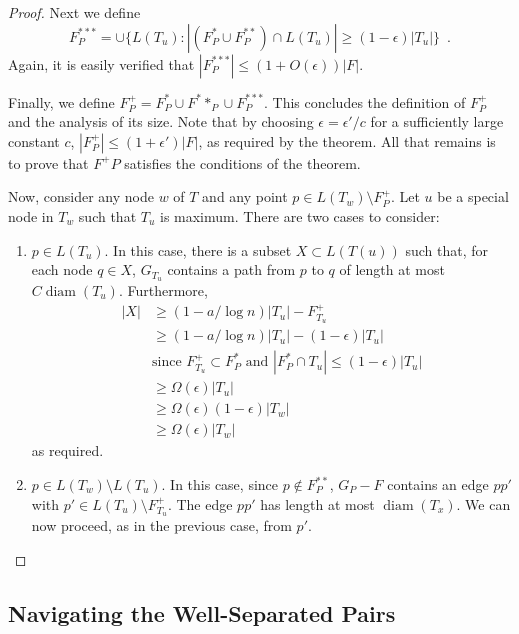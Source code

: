 \documentclass{patmorin}
\DeclareMathOperator{\diam}{diam}
\begin{document}
\begin{proof}
  Next we define 
  \[  F^{***}_P = \cup\{L(T_u) : |(F^*_P\cup F^{**}_P)\cap L(T_u)| \ge (1-\epsilon)|T_u|\} \enspace . \]
  Again, it is easily verified that $|F^{***}_P| \le (1+O(\epsilon))|F|$.

  Finally, we define $F^+_P= F^*_P\cup F^**_P\cup F^{***}_P$.   This
  concludes the definition of $F^+_P$ and the analysis of its size.
  Note that by choosing $\epsilon = \epsilon' /c$ for a sufficiently large
  constant $c$, $|F^+_P|\le (1+\epsilon')|F|$, as required by the theorem.
  All that remains is to prove that $F^+P$ satisfies the conditions of
  the theorem.  

  Now, consider any node $w$ of $T$ and any point $p\in L(T_w)\setminus F^+_P$.
  Let $u$ be a special node in $T_w$ such that $T_u$ is maximum.
  There are two cases to consider:
  \begin{enumerate}
    \item $p\in L(T_u)$. In this case, there is a subset $X\subset L(T(u))$
     such that, for each node $q\in X$, $G_{T_u}$ contains a path from
     $p$ to $q$ of length at most $C\diam(T_u)$. Furthermore,
    \begin{align*}
	    |X| & \ge (1-a/\log n)|T_u| - F^+_{T_u} \\
	        & \ge (1-a/\log n)|T_u| - (1-\epsilon)|T_u| \\
	       & \text{since $F^+_{T_u} \subset F^*_P$ and $|F^*_P\cap T_u|\le (1-\epsilon)|T_u|$} \\
		& \ge \Omega(\epsilon)|T_u| \\ 
		& \ge \Omega(\epsilon)(1-\epsilon)|T_w|  \\
		& \ge \Omega(\epsilon)|T_w| 
    \end{align*}
    as required.
    \item $p\in L(T_w)\setminus L(T_u)$.  In this case, since $p\not\in
    F^{**}_P$, $G_P-F$ contains an edge $pp'$ with $p'\in L(T_u)\setminus
    F^{+}_{T_u}$.  The edge $pp'$ has length at most $\diam(T_x)$.
    We can now proceed, as in the previous case, from $p'$.
  \end{enumerate}
\end{proof}


\subsection{Navigating the Well-Separated Pairs}
\end{document}
